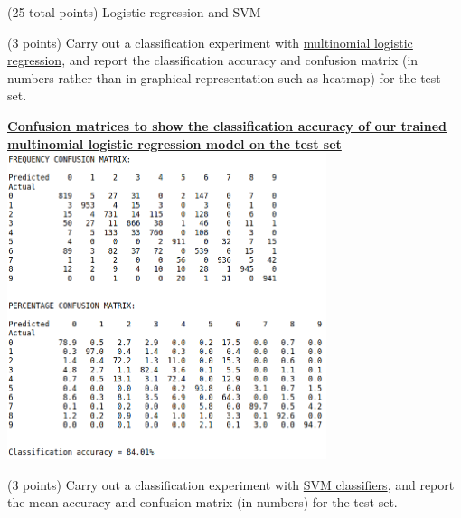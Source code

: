 \documentclass[12pt]{article}
\begin{document}
\begin{question}{(25 total points) Logistic regression and SVM}

  


  \medskip
   \begin{subquestion}{(3 points)
       Carry out a classification experiment with
       \href{https://scikit-learn.org/0.19/modules/generated/sklearn.linear\_model.LogisticRegression.html}{multinomial logistic regression},
       and report the classification accuracy and confusion matrix (in
       numbers rather than in graphical representation such as heatmap)
       for the test set.
     } \label{Q2.1}


   

      \begin{answerbox}{30em}
        \begin{center}
        \textbf{\underline{Confusion matrices to show the classification accuracy of our trained}}\\
        \textbf{\underline{multinomial logistic regression model on the test set}}
        \vspace{0.3cm}\\
         \includegraphics[width=0.7\textwidth]{images/q21.png}
        \end{center}
      \end{answerbox}
  


   \end{subquestion}
   \begin{subquestion}{(3 points)
       Carry out a classification experiment with
       \href{https://scikit-learn.org/0.19/modules/generated/sklearn.svm.SVC.html}{SVM classifiers}, and report the
       mean accuracy and confusion matrix (in numbers) for the test
       set.
     } \label{Q2.2}



\end{subquestion}
\end{question}
\end{document}
